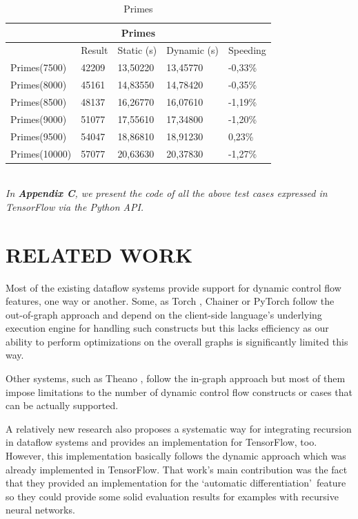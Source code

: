 \documentclass[ack,preface]{dithesis}
\begin{document}
\begin{table}[h!]
\centering
\begin{tabular}{ |p{3cm}||p{2cm}|p{3cm}|p{3cm}||p{2cm}|  }

 \hline
 \multicolumn{5}{|c|}{\textbf{\footnotesize Primes}} \\
 \hline
 	& Result &Static (s)&Dynamic (s)&Speeding\\
 \hline
 Primes(7500)   & 42209  &13,50220    & 13,45770 &   -0,33\%\\
 Primes(8000)   & 45161  &14,83550    &  14,78420  &  -0,35\%\\
 Primes(8500)   & 48137  & 16,26770   &  16,07610  &  -1,19\%\\
 Primes(9000)   & 51077  & 17,55610   & 17,34800   &  -1,20\%\\
 Primes(9500)   & 54047  & 18,86810   &  18,91230  &   0,23\%\\
 Primes(10000) & 57077  &20,63630    &  20,37830  &  -1,27\%\\
 \hline
\end{tabular}
\caption{Primes}
\label{table:1}
\end{table}

\ \\
\textit{In \textbf{Appendix C}, we present the code of all the above test cases expressed in TensorFlow via the Python API.}

\chapter{RELATED WORK}

Most of the existing dataflow systems provide support for dynamic control flow features, one way or another. 
Some, as Torch \cite{Torch}, Chainer \cite{Chainer_learningsys2015} or PyTorch \cite{Paszke2017} follow the out-of-graph approach and depend on the client-side language's underlying execution engine for handling such constructs but this lacks efficiency as our ability to perform optimizations on the overall graphs is significantly limited this way. 

Other systems, such as Theano \cite{Theano1}, follow the in-graph approach but most of them impose limitations to the number of dynamic control flow constructs or cases that can be actually supported. 

A relatively new research \cite{Jeong:2018} also proposes a systematic way for integrating recursion in dataflow systems and provides an implementation for TensorFlow, too. However, 
this implementation basically follows the dynamic approach which was already implemented in TensorFlow. That work's main contribution was the fact that they provided an implementation for the \lq automatic differentiation\rq  \ feature  so they could provide some solid evaluation results for examples with recursive neural networks.
\end{document}
